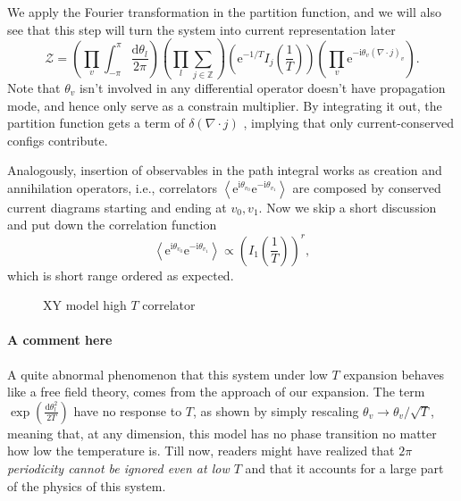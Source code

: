 We apply the Fourier transformation in the partition function, and we will also see that this step will turn the system into current representation later
\begin{equation}
  \mathcal{Z} = \left( \prod_{v}  \int _{-\pi }^{\pi } \frac{\mathrm{d} \theta_{l}}{2\pi } \right) \left( \prod_{l} \sum_{j \in \mathbb{Z}}  \right) \left( \mathrm{e}^{- 1 / T} I_{j}\left( \frac{1}{T} \right) \right) \left( \prod_{v} \mathrm{e}^{-\mathrm{i} \theta_{v} \left( \nabla \cdot j \right)_{v}} \right).
\end{equation}
Note that $\theta_{v}$ isn't involved in any differential operator doesn't have propagation mode, and hence only serve as a constrain multiplier. By integrating it out, the partition function gets a term of $\delta \left( \nabla  \cdot j \right)$ , implying that only current-conserved configs contribute.

Analogously, insertion of observables in the path integral works as creation and annihilation operators, i.e., correlators $\left< \mathrm{e}^{\mathrm{i}\theta_{v_0}} \mathrm{e}^{-\mathrm{i}\theta_{v_1}} \right>$ are composed by conserved current diagrams starting and ending at $v_0, v_1$. Now we skip a short discussion and put down the correlation function
\begin{equation}
  \left< \mathrm{e}^{\mathrm{i}\theta_{v_0}} \mathrm{e}^{-\mathrm{i}\theta_{v_1}} \right> \propto \left( I_1 \left( \frac{1}{T} \right) \right)^{r},
\end{equation}
which is short range ordered as expected.
\begin{figure}[ht]
  \centering
  \caption{XY model high $T$ correlator}
  \label{fig:xy-model-high-t-correlator}
\end{figure}

\paragraph{A comment here} A quite abnormal phenomenon that this system under low $T$ expansion behaves like a free field theory, comes from the approach of our expansion. The term $\exp \left( \frac{\mathrm{d} \theta_{l} ^{2}}{2T} \right)$ have no response to $T$, as shown by simply rescaling $\theta_{v} \to \theta_{v} / \sqrt{T}$, meaning that, at any dimension, this model has no phase transition no matter how low the temperature is. Till now, readers might have realized that \emph{$2\pi $ periodicity cannot be ignored even at low $T$} and that it accounts for a large part of the physics of this system.

